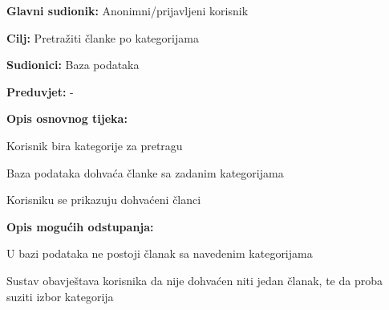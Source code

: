 \noindent {}
\begin{packed_item}

\item \textbf{Glavni sudionik:} Anonimni/prijavljeni korisnik
\item  \textbf{Cilj:} Pretražiti članke po kategorijama
\item  \textbf{Sudionici:} Baza podataka
\item  \textbf{Preduvjet:} -
\item  \textbf{Opis osnovnog tijeka:}

\item[] \begin{packed_enum}

    \item Korisnik bira kategorije za pretragu
    \item Baza podataka dohvaća članke sa zadanim kategorijama
    \item Korisniku se prikazuju dohvaćeni članci

\end{packed_enum}

\item  \textbf{Opis mogućih odstupanja:}

\item[] \begin{packed_item}

    \item[2.a] U bazi podataka ne postoji članak sa navedenim kategorijama

    \item[] \begin{packed_enum}

        \item Sustav obavještava korisnika da nije dohvaćen niti jedan članak, te da proba suziti izbor kategorija

    \end{packed_enum}

\end{packed_item}

\end{packed_item}

